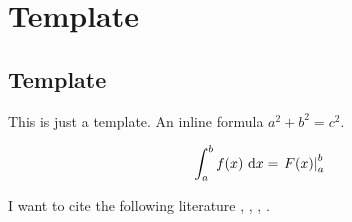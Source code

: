 \chapter{Template}
\section{Template}

This is just a template. An inline formula $a^2 + b^2 = c^2$. 

\begin{equation}
	\int_a^b f(x)\mathop{\!}\mathrm{d} x = \left. F(x) \right|_a^b
\end{equation}

I want to cite the following literature \cite{li2020fourier}, \cite{raissi2019physics}, \cite{ronneberger2015u}, \cite{takamoto2022pdebench}. 
